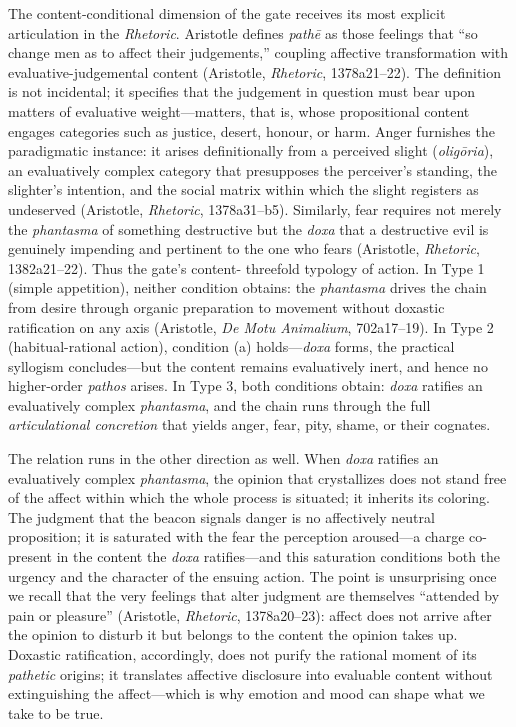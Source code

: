 \documentclass{article}
\begin{document}
The content-conditional dimension of the gate receives its most explicit articulation in the \textit{Rhetoric}. Aristotle defines \textit{pathē} as those feelings that ``so change men as to affect their judgements,'' coupling affective transformation with evaluative-judgemental content (Aristotle, \textit{Rhetoric}, 1378a21--22). The definition is not incidental; it specifies that the judgement in question must bear upon matters of evaluative weight---matters, that is, whose propositional content engages categories such as justice, desert, honour, or harm. Anger furnishes the paradigmatic instance: it arises definitionally from a perceived slight (\textit{oligōria}), an evaluatively complex category that presupposes the perceiver's standing, the slighter's intention, and the social matrix within which the slight registers as undeserved (Aristotle, \textit{Rhetoric}, 1378a31--b5). Similarly, fear requires not merely the \textit{phantasma} of something destructive but the \textit{doxa} that a destructive evil is genuinely impending and pertinent to the one who fears (Aristotle, \textit{Rhetoric}, 1382a21--22). Thus the gate's content- threefold typology of action. In Type 1 (simple appetition), neither condition obtains: the \textit{phantasma} drives the chain from desire through organic preparation to movement without doxastic ratification on any axis (Aristotle, \textit{De Motu Animalium}, 702a17--19). In Type 2 (habitual-rational action), condition (a) holds---\textit{doxa} forms, the practical syllogism concludes---but the content remains evaluatively inert, and hence no higher-order \textit{pathos} arises. In Type 3, both conditions obtain: \textit{doxa} ratifies an evaluatively complex \textit{phantasma}, and the chain runs through the full \textit{articulational concretion} that yields anger, fear, pity, shame, or their cognates.

The relation runs in the other direction as well. When \textit{doxa} ratifies an evaluatively complex \textit{phantasma}, the opinion that crystallizes does not stand free of the affect within which the whole process is situated; it inherits its coloring. The judgment that the beacon signals danger is no affectively neutral proposition; it is saturated with the fear the perception aroused---a charge co-present in the content the \textit{doxa} ratifies---and this saturation conditions both the urgency and the character of the ensuing action. The point is unsurprising once we recall that the very feelings that alter judgment are themselves ``attended by pain or pleasure'' (Aristotle, \textit{Rhetoric}, 1378a20--23): affect does not arrive after the opinion to disturb it but belongs to the content the opinion takes up. Doxastic ratification, accordingly, does not purify the rational moment of its \textit{pathetic} origins; it translates affective disclosure into evaluable content without extinguishing the affect---which is why emotion and mood can shape what we take to be true.
\end{document}
